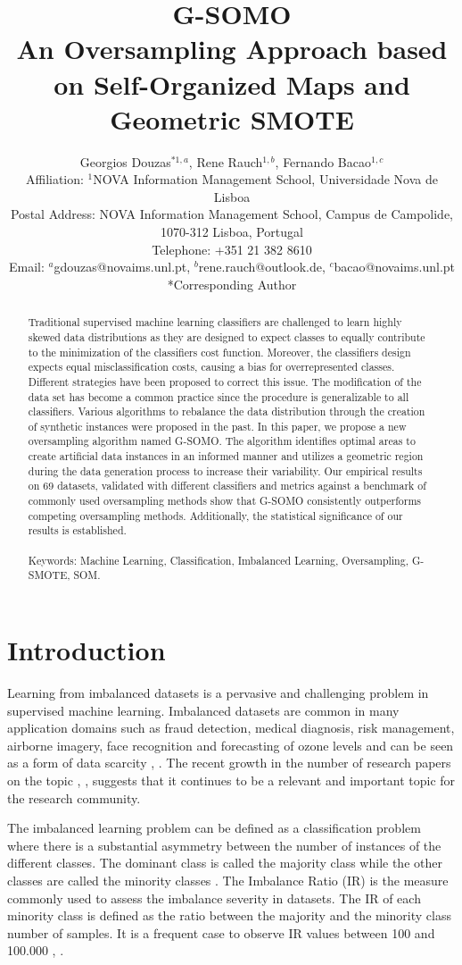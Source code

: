 \documentclass[parskip=full]{scrartcl}
\title{G-SOMO \\ \LARGE{An Oversampling Approach based on Self-Organized Maps and Geometric SMOTE}}
\author{
	Georgios Douzas\(^{* 1, a}\), Rene Rauch\(^{1, b}\), Fernando Bacao\(^{1, c}\)
	\\
	\small{Affiliation: \(^{1}\)NOVA Information Management School, Universidade Nova de Lisboa}
	\\
	\small{Postal Address: NOVA Information Management School, Campus de Campolide, 1070-312 Lisboa, Portugal}
	\\
	\small{Telephone: +351 21 382 8610}
	\\
	\small{Email: \(^{a}\)gdouzas@novaims.unl.pt, \(^{b}\)rene.rauch@outlook.de}, \(^{c}\)bacao@novaims.unl.pt
	\\
	\small{*Corresponding Author}
}
\date{}
\begin{document}
\maketitle

\begin{abstract}
Traditional supervised machine learning classifiers are challenged to learn highly skewed data distributions as they are designed to expect classes to equally contribute to the minimization of the classifiers cost function. Moreover, the classifiers design expects equal misclassification costs, causing a bias for overrepresented classes. Different strategies have been proposed to correct this issue. The modification of the data set has become a common practice since the procedure is generalizable to all classifiers. Various algorithms to rebalance the data distribution through the creation of synthetic instances were proposed in the past. In this paper, we propose a new oversampling algorithm named G-SOMO. The algorithm identifies optimal areas to create artificial data instances in an informed manner and utilizes a geometric region during the data generation process to increase their variability. Our empirical results on 69 datasets, validated with different classifiers and metrics against a benchmark of commonly used oversampling methods show that G-SOMO consistently outperforms competing oversampling methods. Additionally, the statistical significance of our results is established.
\\
\\
Keywords: Machine Learning, Classification, Imbalanced Learning, Oversampling, G-SMOTE, SOM.
\end{abstract}

\section{Introduction}

Learning from imbalanced datasets is a pervasive and challenging problem in supervised machine learning. Imbalanced datasets are common in many application domains such as fraud detection, medical diagnosis, risk management, airborne imagery, face recognition and forecasting of ozone levels and can be seen as a form of data scarcity \cite{Vong2014}, \cite{He2009}. The recent growth in the number of research papers on the topic \cite{Haixiang2017}, \cite{Fernandez2018}, suggests that it continues to be a relevant and important topic for the research community.

The imbalanced learning problem can be defined as a classification problem where there is a substantial asymmetry between the number of instances of the different classes. The dominant class is called the majority class while the other classes are called the minority classes \cite{Chawla2003}. The Imbalance Ratio (IR) is the measure commonly used to assess the imbalance severity in datasets. The IR of each minority class is defined as the ratio between the majority and the minority class number of samples. It is a frequent case to observe IR values between 100 and 100.000 \cite{Chawla2002}, \cite{Barua2014}.
\end{document}
